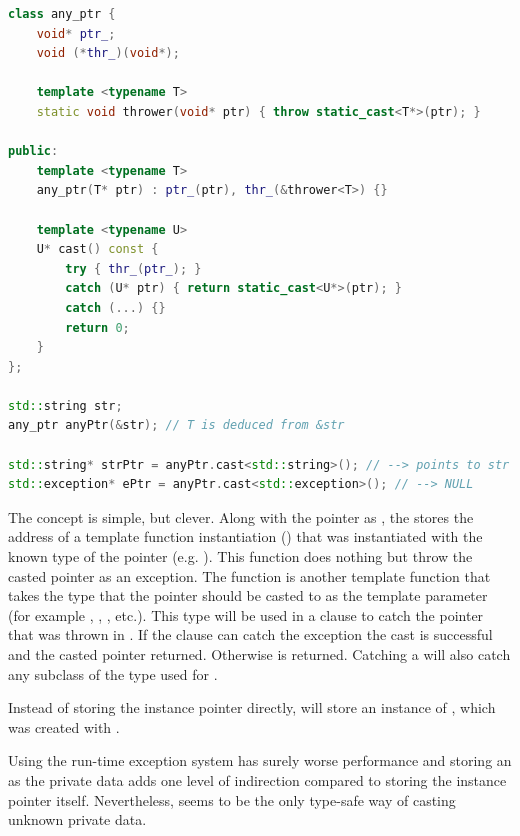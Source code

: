 \begin{lstlisting}[language=C++, caption=Implementation of \mySCName{any\_ptr}]
class any_ptr {
    void* ptr_;
    void (*thr_)(void*);
 
    template <typename T>
    static void thrower(void* ptr) { throw static_cast<T*>(ptr); }
 
public:
    template <typename T>
    any_ptr(T* ptr) : ptr_(ptr), thr_(&thrower<T>) {}
 
    template <typename U>
    U* cast() const {
        try { thr_(ptr_); }
        catch (U* ptr) { return static_cast<U*>(ptr); }
        catch (...) {}
        return 0;
    }
};

std::string str;
any_ptr anyPtr(&str); // T is deduced from &str

std::string* strPtr = anyPtr.cast<std::string>(); // --> points to str
std::exception* ePtr = anyPtr.cast<std::exception>(); // --> NULL
\end{lstlisting}
\OnehalfSpacing

The concept is simple, but clever. Along with the pointer as , the  stores the address of a template function instantiation () that was instantiated with the known type of the pointer (e.g. ). This function does nothing but throw the casted pointer as an exception. The  function is another template function that takes the type that the pointer should be casted to as the template parameter  (for example , , , etc.). This type will be used in a  clause to catch the pointer that was thrown in . If the  clause can catch the exception the cast is successful and the casted pointer returned. Otherwise  is returned. Catching a  will also catch any subclass of the type used for .

Instead of storing the instance pointer directly,  will store an instance of , which was created with . 

Using the run-time exception system has surely worse performance and storing an  as the private data adds one level of indirection compared to storing the instance pointer itself. Nevertheless,  seems to be the only type-safe way of casting unknown private data.

